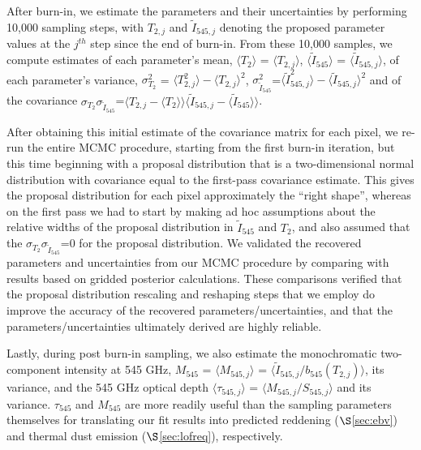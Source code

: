 \documentclass{emulateapj}
\begin{document}
After burn-in, we estimate the parameters and their uncertainties by performing
10,000 sampling steps, with $T_{2, j}$ and $\tilde{I}_{545, j}$ denoting the 
proposed parameter values at the $j^{th}$ step since the end of burn-in. From 
these 10,000 samples, we compute estimates of each parameter's mean, 
$\langle T_2 \rangle$ = $\langle T_{2, j} \rangle$, 
$\langle \tilde{I}_{545} \rangle$ = $\langle \tilde{I}_{545, j} \rangle$, of 
each parameter's variance, 
$\sigma^2_{T_2}$ = $\langle T^2_{2, j} \rangle-\langle T_{2, j} \rangle ^2$, 
$\sigma^2_{\tilde{I}_{545}}$=$\langle \tilde{I}^2_{545, j} 
\rangle-\langle \tilde{I}_{545, j} \rangle ^2$ and of the covariance 
$\sigma_{T_2}\sigma_{\tilde{I}_{545}}$=$\langle T_{2,j}-\langle T_2 \rangle 
\rangle \langle \tilde{I}_{545, j} - \langle \tilde{I}_{545} \rangle \rangle$. 

After obtaining this initial estimate of the covariance matrix for each
pixel, we re-run the entire MCMC procedure, starting from the first burn-in 
iteration, but this time beginning with a proposal distribution that is a 
two-dimensional normal distribution with covariance equal to the first-pass
covariance estimate. This gives the proposal distribution for each pixel
 approximately the ``right shape'', whereas on the first pass we had to start
by making ad hoc assumptions about the relative widths of the proposal 
distribution in $\tilde{I}_{545}$ and $T_2$, and also assumed that the 
$\sigma_{T_2}\sigma_{\tilde{I}_{545}}$=0 for the proposal distribution. We
validated the recovered parameters and uncertainties from our MCMC procedure
by comparing with results based on gridded posterior calculations. These 
comparisons verified that the proposal distribution rescaling and reshaping 
steps that we employ do improve the accuracy of the recovered 
parameters/uncertainties, and that the parameters/uncertainties ultimately 
derived are highly reliable.

Lastly, during post burn-in sampling, we also estimate the monochromatic 
two-component intensity at 545 GHz, $M_{545}$ = $\langle M_{545, j} \rangle$ = 
$\langle \tilde{I}_{545, j}/b_{545}(T_{2,j}) \rangle$, its variance, and
the 545 GHz optical depth $\langle \tau_{545, j} \rangle$ = 
$\langle M_{545, j}/S_{545, j} \rangle$ and its variance. $\tau_{545}$ and 
$M_{545}$ are more readily useful than the sampling parameters themselves for 
translating our fit results into predicted reddening ($\S$\ref{sec:ebv}) and 
thermal dust emission ($\S$\ref{sec:lofreq}), respectively.
\end{document}
